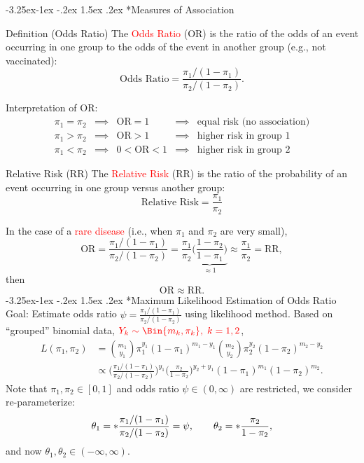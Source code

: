 \documentclass[final]{article}\usepackage[]{graphicx}\usepackage[svgnames]{xcolor}
\makeatletter
\renewcommand\subsection{\@startsection{subsection}{2}{\z@}%
                                     {-3.25ex\@plus -1ex \@minus -.2ex}%
                                     {1.5ex \@plus .2ex}%
                                     {\normalfont\large\bfseries\scshape\color{Blue}}}
\let\log\relax%
\newcommand{\OR}{\text{OR}}%
\newcommand{\RR}{\text{RR}}%
\makeatother
\begin{document}
\subsection*{Measures of Association}
\begin{Regular}{Definition (Odds Ratio)}
    The \textcolor{Red}{Odds Ratio} (OR) is the ratio of the odds of an event occurring in one
    group to the odds of the event in another group (e.g., not vaccinated):
    \[ \text{Odds Ratio}=\frac{\pi_1/(1-\pi_1)}{\pi_2/(1-\pi_2)}. \]
\end{Regular}
Interpretation of OR:
\[ \begin{array}{ccccc}
        \pi_1=\pi_2 & \implies & \OR=1   & \implies & \text{equal risk (no association)} \\
        \pi_1>\pi_2 & \implies & \OR>1   & \implies & \text{higher risk in group 1}      \\
        \pi_1<\pi_2 & \implies & 0<\OR<1 & \implies & \text{higher risk in group 2}
    \end{array} \]
\begin{Regular}{Relative Risk (RR)}
    The \textcolor{Red}{Relative Risk} (RR) is the ratio of the probability of an event occurring in one group versus another group:
    \[ \text{Relative Risk}=\frac{\pi_1}{\pi_2} \]
\end{Regular}
In the case of a \textcolor{Red}{rare disease} (i.e., when $ \pi_1 $ and $ \pi_2 $ are very small),
\[ \OR=\frac{\pi_1/(1-\pi_1)}{\pi_2/(1-\pi_2)}=\frac{\pi_1}{\pi_2}\underbrace{\biggl(\frac{1-\pi_2}{1-\pi_1}\biggr)}_{\approx 1}\approx \frac{\pi_1}{\pi_2} =\RR,  \]
then
\[ \OR\approx\RR. \]
\subsection*{Maximum Likelihood Estimation of Odds Ratio}
Goal: Estimate odds ratio $ \psi=\frac{\pi_1/(1-\pi_1)}{\pi_2/(1-\pi_2)} $ using likelihood method. Based
on ``grouped'' binomial data, $ \textcolor{Red}{Y_k \sim \Bin{m_k,\pi_k},\; k=1,2} $,
\begin{align*}
    L(\pi_1,\pi_2)
     & =\binom{m_1}{y_1}\pi_1^{y_1}(1-\pi_1)^{m_1-y_1}\binom{m_2}{y_2}\pi_2^{y_2}(1-\pi_2)^{m_2-y_2}                                                        \\
     & \propto\biggl(\frac{\pi_1/(1-\pi_1)}{\pi_2/(1-\pi_2)} \biggr)^{\!y_1}\biggl(\frac{\pi_2}{1-\pi_2}\biggr)^{\! y_2+y_1}(1-\pi_1)^{m_1}(1-\pi_2)^{m_2}.
\end{align*}
Note that $ \pi_1,\pi_2\in[0,1] $ and odds ratio $ \psi\in(0,\infty) $ are restricted, we consider re-parameterize:
\[ \theta_1=\log*{\frac{\pi_1/(1-\pi_1)}{\pi_2/(1-\pi_2)}}=\log{\psi},\qquad \theta_2=\log*{\frac{\pi_2}{1-\pi_2}}, \]
and now $ \theta_1,\theta_2\in(-\infty,\infty) $.
\end{document}
